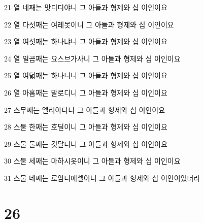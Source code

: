 \par 21 열 네째는 맛디디야니 그 아들과 형제와 십 이인이요
\par 22 열 다섯째는 여레못이니 그 아들과 형제와 십 이인이요
\par 23 열 여섯째는 하나냐니 그 아들과 형제와 십 이인이요
\par 24 열 일곱째는 요스브가사니 그 아들과 형제와 십 이인이요
\par 25 열 여덟째는 하나니니 그 아들과 형제와 십 이인이요
\par 26 열 아홉째는 말로디니 그 아들과 형제와 십 이인이요
\par 27 스무째는 엘리아다니 그 아들과 형제와 십 이인이요
\par 28 스물 한째는 호딜이니 그 아들과 형제와 십 이인이요
\par 29 스물 둘째는 깃달디니 그 아들과 형제와 십 이인이요
\par 30 스물 세째는 마하시옷이니 그 아들과 형제와 십 이인이요
\par 31 스물 네째는 로암디에셀이니 그 아들과 형제와 십 이인이었더라

\chapter{26}

